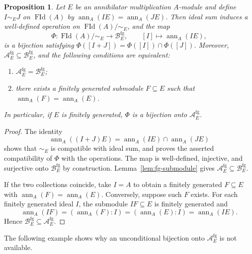 \documentclass[11pt]{amsart}
\theoremstyle{plain}
\newtheorem{proposition}[theorem]{Proposition}
\theoremstyle{definition}
\theoremstyle{remark}
\newcommand{\ann}{\operatorname{ann}}
\newcommand{\FGId}{\operatorname{FId}}
\numberwithin{equation}{section}
\begin{document}
\begin{proposition}\label{prop:lattice-quotient}
Let $E$ be an annihilator multiplication $A$-module and define
$I\sim_E J$ on $\FGId(A)$ by $\ann_A(IE)=\ann_A(JE)$.
Then ideal sum induces a well-defined operation on $\FGId(A)/{\sim_E}$,
and the map
\[
\Phi:\FGId(A)/{\sim_E}\longrightarrow\mathcal B_E^{\mathrm{fg}},
\qquad [I]\longmapsto\ann_A(IE),
\]
is a bijection satisfying
$\Phi([I+J])=\Phi([I])\cap\Phi([J])$.
Moreover, $\mathcal A_E^{\mathrm{fg}}\subseteq\mathcal B_E^{\mathrm{fg}}$,
and the following conditions are equivalent:
\begin{enumerate}[label=\textup{(\roman*)}]
\item $\mathcal A_E^{\mathrm{fg}}=\mathcal B_E^{\mathrm{fg}}$;
\item there exists a finitely generated submodule $F\subseteq E$ such that
$\ann_A(F)=\ann_A(E)$.
\end{enumerate}
In particular, if $E$ is finitely generated, $\Phi$ is a bijection onto
$\mathcal A_E^{\mathrm{fg}}$.
\end{proposition}

\begin{proof}
The identity
\[
\ann_A((I+J)E)=\ann_A(IE)\cap\ann_A(JE)
\]
shows that $\sim_E$ is compatible with ideal sum, and proves the asserted
compatibility of $\Phi$ with the operations.
The map is well-defined, injective, and surjective onto
$\mathcal B_E^{\mathrm{fg}}$ by construction.
Lemma~\ref{lem:fg-submodule} gives
$\mathcal A_E^{\mathrm{fg}}\subseteq\mathcal B_E^{\mathrm{fg}}$.

If the two collections coincide, take $I=A$ to obtain a finitely generated
$F\subseteq E$ with $\ann_A(F)=\ann_A(E)$.
Conversely, suppose such $F$ exists. For each finitely generated ideal $I$,
the submodule $IF\subseteq E$ is finitely generated and
\[
\ann_A(IF)=(\ann_A(F):I)=(\ann_A(E):I)=\ann_A(IE).
\]
Hence $\mathcal B_E^{\mathrm{fg}}\subseteq\mathcal A_E^{\mathrm{fg}}$.
\end{proof}

The following example shows why an unconditional bijection onto
$\mathcal A_E^{\mathrm{fg}}$ is not available.
\end{document}
